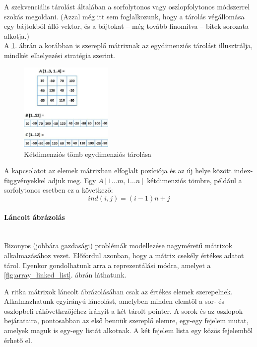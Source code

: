 \documentclass[12pt,margin=0px]{article}
\begin{document}
    \noindent A szekvenciális tárolást általában a sorfolytonos vagy oszlopfolytonos módszerrel szokás megoldani. (Azzal még itt sem foglalkozunk, hogy a tárolás végállomása egy bájtokból álló vektor, és a bájtokat – még tovább finomítva – bitek sorozata alkotja.)\\

    \noindent A \ref{fig:array_storage_one}. ábrán a korábban is szereplő mátrixnak az egydimenziós tárolást illusztrálja, mindkét elhelyezési stratégia szerint.

	\begin{figure}[H]
		\centering
		\includegraphics[width=0.4\textwidth]{img/array_storage1.png}
		\caption{Kétdimenziós tömb egydimenziós tárolása}
        \label{fig:array_storage_one}
	\end{figure}

    \noindent A kapcsolatot az elemek mátrixban elfoglalt pozíciója és az új helye között index-függvényekkel adjuk meg. Egy $A[1 \ldots m, 1\ldots n]$ kétdimenziós tömbre, például a sorfolytonos esetben ez a következő:
    \[
        ind(i,j) = (i-1)n + j
    \]

    \paragraph{Láncolt ábrázolás\\\\}

    \noindent Bizonyos (jobbára gazdasági) problémák modellezése nagyméretű mátrixok alkalmazásához vezet. Előfordul azonban, hogy a mátrix csekély értékes adatot tárol. Ilyenkor gondolhatunk arra a reprezentálási módra, amelyet a \ref{fig:array_linked_list}. ábrán láthatunk.

    \noindent A ritka mátrixok láncolt ábrázolásában csak az értékes elemek szerepelnek. Alkalmazhatunk egyirányú láncolást, amelyben minden elemtől a sor- és oszlopbeli rákövetkezőjéhez irányít a két tárolt pointer. A sorok és az oszlopok bejárataira, pontosabban az első bennük szereplő elemre, egy-egy fejelem mutat, amelyek maguk is egy-egy listát alkotnak. A két fejelem lista egy közös fejelemből érhető el.
\end{document}
